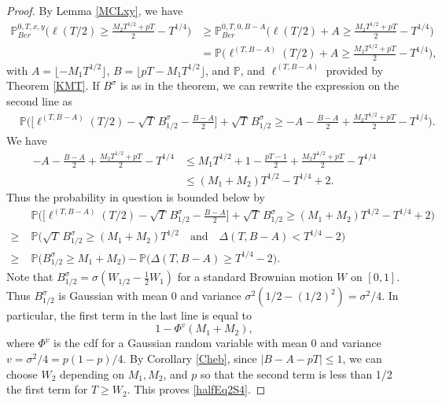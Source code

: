 \begin{proof}
	By Lemma \ref{MCLxy}, we have
	\begin{align*}
	\mathbb{P}^{0,T,x,y}_{Ber}\bigg( \ell( T/2 )  \geq \frac{M_2T^{1/2} + p T}{2} - T^{1/4} \bigg) &\geq \mathbb{P}^{0,T,0,B-A}_{Ber}\bigg( \ell( T/2 ) + A  \geq \frac{M_2T^{1/2} + p T}{2} - T^{1/4} \bigg)\\
	&= \mathbb{P}\bigg( \ell^{(T,B-A)}( T/2 ) + A  \geq \frac{M_2T^{1/2} + p T}{2} - T^{1/4} \bigg),
	\end{align*}
	with $A = \lfloor -M_1T^{1/2}\rfloor$, $B = \lfloor pT-M_1T^{1/2}\rfloor$, and $\mathbb{P}$, and $\ell^{(T,B-A)}$ provided by Theorem \ref{KMT}. If $B^\sigma$ is as in the theorem, we can rewrite the expression on the second line as
	\begin{align*}
	& \mathbb{P}\bigg( \bigg[\ell^{(T,B-A)}( T/2 ) -\sqrt{T}\,B^\sigma_{1/2} - \frac{B-A}{2}\bigg] + \sqrt{T}\,B^\sigma_{1/2}  \geq -A - \frac{B-A}{2} + \frac{M_2T^{1/2} + p T}{2} - T^{1/4} \bigg).
	\end{align*}
	We have
	\begin{align*}
	-A - \frac{B-A}{2} + \frac{M_2T^{1/2} + p T}{2} - T^{1/4} & \leq M_1T^{1/2} + 1 - \frac{pT-1}{2} + \frac{M_2T^{1/2} + p T}{2} - T^{1/4}\\
	&\leq (M_1 + M_2)T^{1/2} - T^{1/4} + 2.
	\end{align*}
	Thus the probability in question is bounded below by
	\begin{align*}
	& \mathbb{P}\bigg( \bigg[\ell^{(T,B-A)}( T/2 ) -\sqrt{T}\,B^\sigma_{1/2} - \frac{B-A}{2}\bigg] + \sqrt{T}\,B^\sigma_{1/2}  \geq (M_1 + M_2)T^{1/2} - T^{1/4} + 2 \bigg)\\
	\geq \; & \mathbb{P}\bigg( \sqrt{T}\,B^\sigma_{1/2} \geq (M_1 + M_2)T^{1/2} \quad \mathrm{and} \quad \Delta(T,B-A) < T^{1/4} - 2 \bigg)\\
	\geq \; & \mathbb{P}\big( B^\sigma_{1/2} \geq M_1 + M_2 \big) - \mathbb{P}\big( \Delta(T,B-A) \geq T^{1/4} - 2 \big).
	\end{align*}
	Note that $B^\sigma_{1/2} = \sigma(W_{1/2} - \frac{1}{2}W_1)$ for a standard Brownian motion $W$ on $[0,1]$. Thus $B^\sigma_{1/2}$ is Gaussian with mean 0 and variance $\sigma^2(1/2-(1/2)^2) = \sigma^2/4$. In particular, the first term in the last line is equal to
	\[
	1 - \Phi^v(M_1+M_2),
	\]
	where $\Phi^v$ is the cdf for a Gaussian random variable with mean 0 and variance $v=\sigma^2/4 = p(1-p)/4$. By Corollary \ref{Cheb}, since $|B-A-pT| \leq 1$, we can choose $W_2$ depending on $M_1,M_2$, and $p$ so that the second term is less than 1/2 the first term for $T\geq W_2$. This proves \eqref{halfEq2S4}.
\end{proof}


